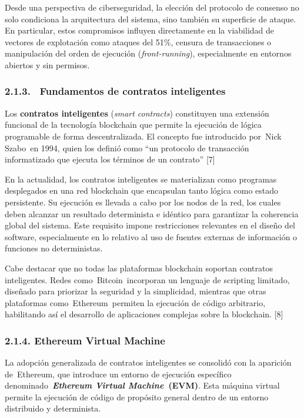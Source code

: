 Desde una perspectiva de ciberseguridad, la elección del protocolo de
consenso no solo condiciona la arquitectura del sistema, sino también su
superficie de ataque. En particular, estos compromisos influyen
directamente en la viabilidad de vectores de explotación como ataques
del 51\%, censura de transacciones o manipulación del orden de ejecución
(\emph{front-running}), especialmente en entornos abiertos y sin
permisos.

\subsubsection{2.1.3. ~Fundamentos de contratos
inteligentes}\label{fundamentos-de-contratos-inteligentes}

Los \textbf{contratos inteligentes} (\emph{smart contracts}) constituyen
una extensión funcional de la tecnología blockchain que permite la
ejecución de lógica programable de forma descentralizada. El concepto
fue introducido por~Nick Szabo~en 1994, quien los definió como ``un
protocolo de transacción informatizado que ejecuta los términos de un
contrato'' {[}7{]}

En la actualidad, los contratos inteligentes se materializan como
programas desplegados en una red blockchain que encapsulan tanto lógica
como estado persistente. Su ejecución es llevada a cabo por los nodos de
la red, los cuales deben alcanzar un resultado determinista e idéntico
para garantizar la coherencia global del sistema. Este requisito impone
restricciones relevantes en el diseño del software, especialmente en lo
relativo al uso de fuentes externas de información o funciones no
deterministas.

Cabe destacar que no todas las plataformas blockchain soportan contratos
inteligentes. Redes como~Bitcoin~incorporan un lenguaje de scripting
limitado, diseñado para priorizar la seguridad y la simplicidad,
mientras que otras plataformas como~Ethereum~permiten la ejecución de
código arbitrario, habilitando así el desarrollo de aplicaciones
complejas sobre la blockchain. {[}8{]}

\subsubsection{2.1.4. Ethereum Virtual
Machine}\label{ethereum-virtual-machine}

La adopción generalizada de contratos inteligentes se consolidó con la
aparición de~Ethereum, que introduce un entorno de ejecución específico
denominado~\textbf{\emph{Ethereum Virtual Machine}~(EVM)}. Esta máquina
virtual permite la ejecución de código de propósito general dentro de un
entorno distribuido y determinista.

